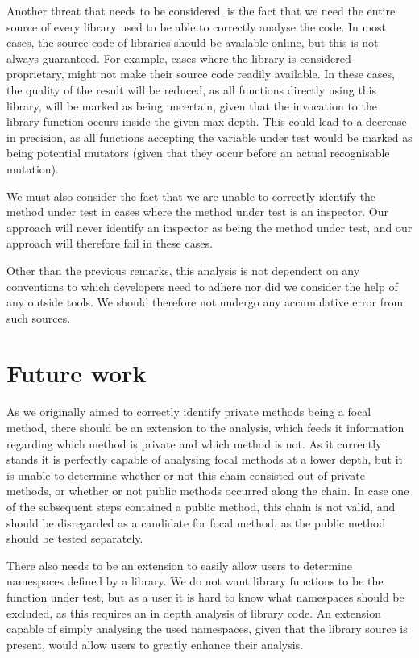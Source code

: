 \documentclass[11pt]{article}
\begin{document}
\begin{multicols}{2}
Another threat that needs to be considered, is the fact that we need the entire source of every library used to be able to correctly analyse the code. In most cases, the source code of libraries should be available online, but this is not always guaranteed. For example, cases where the library is considered proprietary, might not make their source code readily available. In these cases, the quality of the result will be reduced, as all functions directly using this library, will be marked as being uncertain, given that the invocation to the library function occurs inside the given max depth. This could lead to a decrease in precision, as all functions accepting the variable under test would be marked as being potential mutators (given that they occur before an actual recognisable mutation).

We must also consider the fact that we are unable to correctly identify the method under test in cases where the method under test is an inspector. Our approach will never identify an inspector as being the method under test, and our approach will therefore fail in these cases. 

Other than the previous remarks, this analysis is not dependent on any conventions to which developers need to adhere nor did we consider the help of any outside tools. We should therefore not undergo any accumulative error from such sources.

\section{Future work}
As we originally aimed to correctly identify private methods being a focal method, there should be an extension to the analysis, which feeds it information regarding which method is private and which method is not. As it currently stands it is perfectly capable of analysing focal methods at a lower depth, but it is unable to determine whether or not this chain consisted out of private methods, or whether or not public methods occurred along the chain. In case one of the subsequent steps contained a public method, this chain is not valid, and should be disregarded as a candidate for focal method, as the public method should be tested separately.

There also needs to be an extension to easily allow users to determine namespaces defined by a library. We do not want library functions to be the function under test, but as a user it is hard to know what namespaces should be excluded, as this requires an in depth analysis of library code. An extension capable of simply analysing the used namespaces, given that the library source is present, would allow users to greatly enhance their analysis.


\end{multicols}
\end{document}
